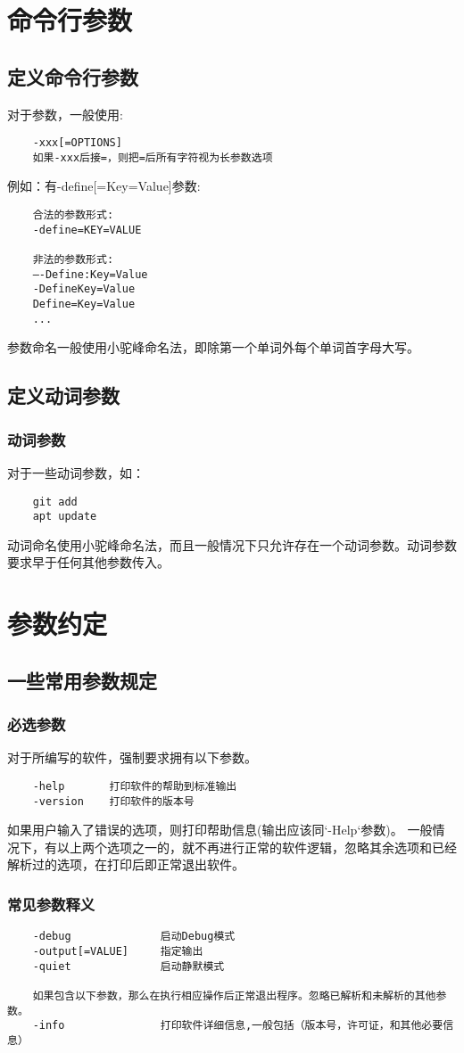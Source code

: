 \chapter{命令行参数}
\section{定义命令行参数}

对于参数，一般使用:
\begin{lstlisting}
	-xxx[=OPTIONS]
	如果-xxx后接=，则把=后所有字符视为长参数选项	
\end{lstlisting}

例如：有-define[=Key=Value]参数:
\begin{lstlisting}
	合法的参数形式:
	-define=KEY=VALUE
	
	非法的参数形式:
	—-Define:Key=Value
	-DefineKey=Value
	Define=Key=Value
	...
\end{lstlisting}
参数命名一般使用小驼峰命名法，即除第一个单词外每个单词首字母大写。



\section{定义动词参数}
\subsection{动词参数}
对于一些动词参数，如：
\begin{lstlisting}
	git add
	apt update
\end{lstlisting}
动词命名使用小驼峰命名法，而且一般情况下只允许存在一个动词参数。动词参数要求早于任何其他参数传入。


\chapter{参数约定}

\section{一些常用参数规定}

\subsection{必选参数}

对于所编写的软件，强制要求拥有以下参数。
\label{_PARAM_HELP_RULE_}
\begin{lstlisting}
	-help		打印软件的帮助到标准输出
	-version	打印软件的版本号
\end{lstlisting}
如果用户输入了错误的选项，则打印帮助信息(输出应该同`-Help`参数)。
一般情况下，有以上两个选项之一的，就不再进行正常的软件逻辑，忽略其余选项和已经解析过的选项，在打印后即正常退出软件。


\subsection{常见参数释义}
\begin{lstlisting}
	-debug				启动Debug模式
	-output[=VALUE]		指定输出
	-quiet				启动静默模式
	
	如果包含以下参数，那么在执行相应操作后正常退出程序。忽略已解析和未解析的其他参数。
	-info 				打印软件详细信息,一般包括（版本号，许可证，和其他必要信息）
\end{lstlisting}

